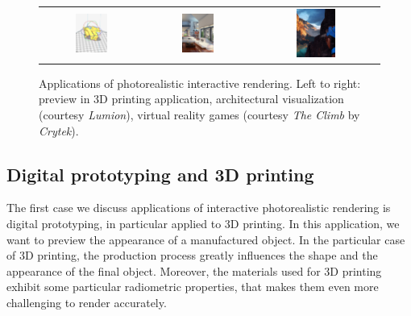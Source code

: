 \begin{figure}
\centering
\begin{tabular}{@{}c@{}c@{}c@{}}
	 \includegraphics[width=0.33\textwidth]{figures/3dprinting_preview_crop} & 	 \includegraphics[width=0.33\textwidth]{figures/lumion-crop.jpg} 
& 	 \includegraphics[width=0.33\textwidth]{figures/the-climb-crop.jpg} \\
\end{tabular}
\caption{Applications of photorealistic interactive rendering. Left to right: preview in 3D printing application, architectural visualization (courtesy \emph{Lumion}), virtual reality games (courtesy \emph{The Climb} by \emph{Crytek}).} 
\label{fig:applications}
\end{figure}

\subsection{Digital prototyping and 3D printing}
The first case we discuss applications of interactive photorealistic rendering is digital prototyping, in particular applied to 3D printing. In this application, we want to preview the appearance of a manufactured object. In the particular case of 3D printing, the production process greatly influences the shape and the appearance of the final object. Moreover, the materials used for 3D printing exhibit some particular radiometric properties, that makes them even more challenging to render accurately. 

